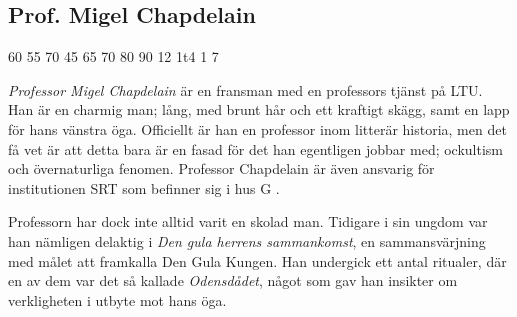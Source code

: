 \subsection{Prof. Migel Chapdelain}
\label{kar:MigelChapdelain}
\character
{60}	%
{55}	%
{70}	%
{45}	%
{65}	%
{70}	%
{80}	%
{90}	%
{12}	%
{1t4}		%
{1}		%
{7}		%
%
{
}
%
{
\textit{Professor Migel Chapdelain} är en fransman med en professors tjänst på LTU. Han är en charmig man; lång, med brunt hår och ett kraftigt skägg, samt en lapp för hans vänstra öga. Officiellt är han en professor inom litterär historia, men det få vet är att detta bara är en fasad för det han egentligen jobbar med; ockultism och övernaturliga fenomen. Professor Chapdelain är även ansvarig för institutionen SRT som befinner sig i hus G \sectiondescribe{\ref{loc:SRT}}.

Professorn har dock inte alltid varit en skolad man. Tidigare i sin ungdom var han nämligen delaktig i \textit{Den gula herrens sammankomst}, en sammansvärjning med målet att framkalla Den Gula Kungen. Han undergick ett antal ritualer, där en av dem var det så kallade \textit{Odensdådet}, något som gav han insikter om verkligheten i utbyte mot hans öga.
}

